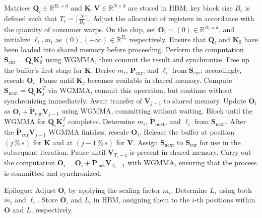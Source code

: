 \begin{algorithm}[H]
    \caption{\small\label{alg:flash3_wgmma}\textsc{FlashAttention-3} consumer warpgroup forward pass}
    \begin{algorithmic}[1]
      \REQUIRE  Matrices $\mathbf{Q}_i \in \mathbb{R}^{B_r \times d}$ and $\mathbf{K}, \mathbf{V} \in \mathbb{R}^{N \times d}$ are stored in HBM; key block size $B_c$ is defined such that $T_c = \lceil \frac{N}{B_c} \rceil$.
      \STATE Adjust the allocation of registers in accordance with the quantity of consumer warps.
      \STATE On the chip, set $\mathbf{O}_i = (0) \in \mathbb{R}^{B_r \times d}$, and initialize $\ell_i, m_i$ as $(0), (-\infty) \in \mathbb{R}^{B_r}$ respectively.
      \STATE Ensure that $\mathbf{Q}_i$ and $\mathbf{K}_0$ have been loaded into shared memory before proceeding.
      \STATE Perform the computation $\mathbf{S}_{\mathrm{cur}} = \mathbf{Q}_i \mathbf{K}_0^T$ using WGMMA, then commit the result and synchronize.
      \STATE Free up the buffer's first stage for $\mathbf{K}$.
      \STATE Derive $m_{i}$, $\tilde{\mathbf{P}}_{\mathrm{cur}}$, and $\ell_{i}$ from $\mathbf{S}_{\mathrm{cur}}$; accordingly, rescale $\mathbf{O}_i$.
        \STATE Pause until $\mathbf{K}_j$ becomes available in shared memory.
        \label{code:mainloop_start}
        \STATE Compute $\mathbf{S}_{\mathrm{next}} = \mathbf{Q}_i \mathbf{K}_{j}^T$ via WGMMA, commit this operation, but continue without synchronizing immediately. \label{code:first_wgmma}
        \STATE Await transfer of $\mathbf{V}_{j-1}$ to shared memory.
        \STATE Update $\mathbf{O}_{i}$ as $\mathbf{O}_{i} + \tilde{\mathbf{P}}_{\mathrm{cur}} \mathbf{V}_{j-1}$ using WGMMA, committing without waiting. \label{code:second_wgmma}
        \STATE Block until the WGMMA for $\mathbf{Q}_i \mathbf{K}_{j}^T$ completes.
        \STATE Determine $m_{i}$, $\tilde{\mathbf{P}}_{\mathrm{next}}$, and $\ell_{i}$ from $\mathbf{S}_{\mathrm{next}}$. \label{code:softmax}
        \STATE After the $\tilde{\mathbf{P}}_{\mathrm{cur}} \mathbf{V}_{j-1}$ WGMMA finishes, rescale $\mathbf{O}_i$.
        \STATE Release the buffer at position $(j\,\%\,s)$ for $\mathbf{K}$ and at $(j-1\,\%\,s)$ for $\mathbf{V}$.
        \STATE Assign $\mathbf{S}_{\mathrm{next}}$ to $\mathbf{S}_{\mathrm{cur}}$ for use in the subsequent iteration.
        \label{code:mainloop_end}
      \ENDFOR \STATE Pause until $\mathbf{V}_{T_c - 1}$ is present in shared memory.
      \STATE Carry out the computation
      $\mathbf{O}_{i} = \mathbf{O}_{i} + \tilde{\mathbf{P}}_{\mathrm{last}} \mathbf{V}_{T_c - 1}$ with WGMMA, ensuring that the process is committed and synchronized.

\STATE Epilogue: Adjust $\mathbf{O}_{i}$ by applying the scaling factor $m_{i}$. Determine $L_{i}$ using both $m_{i}$ and $\ell_{i}$.
Store $\mathbf{O}_{i}$ and $L_{i}$ in HBM, assigning them to the $i$-th positions within $\mathbf{O}$ and $L$, respectively.
\end{algorithmic}
\end{algorithm}

